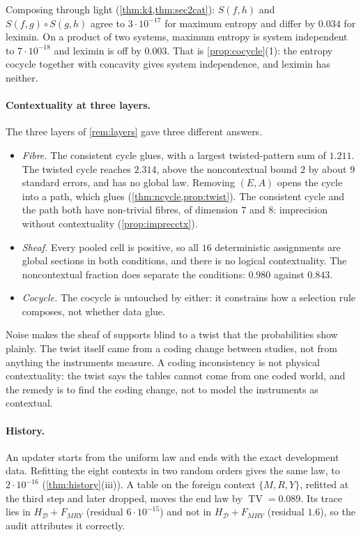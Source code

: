 \documentclass[11pt]{article}
\theoremstyle{definition}\newtheorem{definition}[theorem]{Definition}\newtheorem{remark}[theorem]{Remark}\newtheorem{example}[theorem]{Example}\newtheorem{problem}[theorem]{Open problem}\crefname{problem}{Problem}{Problems}
\begin{document}
Composing through light (\cref{thm:k4,thm:sec2cat}): $S(f,h)$ and $S(f,g)\circ S(g,h)$ agree to $3\cdot10^{-17}$ for maximum entropy and differ by $0.034$ for leximin. On a product of two systems, maximum entropy is system independent to $7\cdot10^{-18}$ and leximin is off by $0.003$. That is \cref{prop:cocycle}(1): the entropy cocycle together with concavity gives system independence, and leximin has neither.

\paragraph{Contextuality at three layers.} The three layers of \cref{rem:layers} gave three different answers.
\begin{itemize}
\item \emph{Fibre.} The consistent cycle glues, with a largest twisted-pattern sum of $1.211$. The twisted cycle reaches $2.314$, above the noncontextual bound $2$ by about $9$ standard errors, and has no global law. Removing $(E,A)$ opens the cycle into a path, which glues (\cref{thm:ncycle,prop:twist}). The consistent cycle and the path both have non-trivial fibres, of dimension $7$ and $8$: imprecision without contextuality (\cref{prop:imprecctx}).
\item \emph{Sheaf.} Every pooled cell is positive, so all $16$ deterministic assignments are global sections in both conditions, and there is no logical contextuality. The noncontextual fraction does separate the conditions: $0.980$ against $0.843$.
\item \emph{Cocycle.} The cocycle is untouched by either: it constrains how a selection rule composes, not whether data glue.
\end{itemize}
Noise makes the sheaf of supports blind to a twist that the probabilities show plainly. The twist itself came from a coding change between studies, not from anything the instruments measure. A coding inconsistency is not physical contextuality: the twist says the tables cannot come from one coded world, and the remedy is to find the coding change, not to model the instruments as contextual.

\paragraph{History.} An updater starts from the uniform law and ends with the exact development data. Refitting the eight contexts in two random orders gives the same law, to $2\cdot10^{-16}$ (\cref{thm:history}(iii)). A table on the foreign context $\{M,R,Y\}$, refitted at the third step and later dropped, moves the end law by $\operatorname{TV}=0.089$. Its trace lies in $H_{\mathcal D}+F_{MRY}$ (residual $6\cdot10^{-15}$) and not in $H_{\mathcal D}+F_{MHY}$ (residual $1.6$), so the audit attributes it correctly.
\end{document}

